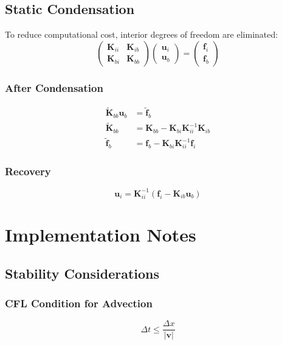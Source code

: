 \documentclass[11pt,a4paper]{article}
\begin{document}
\subsection{Static Condensation}

To reduce computational cost, interior degrees of freedom are eliminated:
\begin{equation}
\begin{pmatrix}
\bm{K}_{ii} & \bm{K}_{ib} \\
\bm{K}_{bi} & \bm{K}_{bb}
\end{pmatrix}
\begin{pmatrix}
\bm{u}_i \\
\bm{u}_b
\end{pmatrix}
=
\begin{pmatrix}
\bm{f}_i \\
\bm{f}_b
\end{pmatrix}
\end{equation}

\subsubsection{After Condensation}
\begin{align}
\tilde{\bm{K}}_{bb} \bm{u}_b &= \tilde{\bm{f}}_b\\
\tilde{\bm{K}}_{bb} &= \bm{K}_{bb} - \bm{K}_{bi} \bm{K}_{ii}^{-1} \bm{K}_{ib}\\
\tilde{\bm{f}}_b &= \bm{f}_b - \bm{K}_{bi} \bm{K}_{ii}^{-1} \bm{f}_i
\end{align}

\subsubsection{Recovery}
\begin{equation}
\bm{u}_i = \bm{K}_{ii}^{-1}(\bm{f}_i - \bm{K}_{ib} \bm{u}_b)
\end{equation}

\section{Implementation Notes}

\subsection{Stability Considerations}

\subsubsection{CFL Condition for Advection}
\begin{equation}
\Delta t \leq \frac{\Delta x}{|\bm{v}|}
\end{equation}
\end{document}
